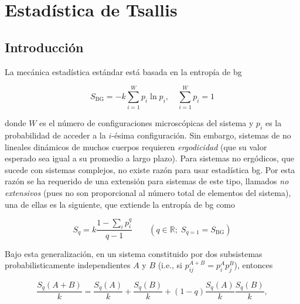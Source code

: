 \chapter{Estadística de Tsallis}\label{ch-Tsallis}


\section{Introducción}

La mecánica estadística estándar está basada en la entropía de \acrfull{bg}

\begin{equation}
{S}_{\mathrm{BG}} = - k \sum_{i=1}^{W} {p}_{i} \ln {p}_{i}, \quad \sum_{i=1}^{W} {p}_{i} = 1
\end{equation}

donde $W$ es el número de configuraciones microscópicas del sistema y ${p}_{i}$ es la probabilidad de acceder a la $i$-ésima configuración. Sin embargo, sistemas de no lineales dinámicos de muchos cuerpos requieren \emph{ergodicidad} (que su valor esperado sea igual a su promedio a largo plazo). Para sistemas no ergódicos, que sucede con sistemas complejos, no existe razón para usar estadística \acrshort{bg}. Por esta razón se ha requerido de una extensión para sistemas de este tipo, llamados \emph{no extensivos} (pues no son proporcional al número total de elementos del sistema), una de ellas es la siguiente, que extiende la entropía de \acrshort{bg} como

\begin{equation}
{S}_{q} = k \frac{1-\sum_{i} {p}_{i}^{q}}{q-1} \qquad (q\in \mathbb{R};\; {S}_{q=1} = {S}_{\mathrm{BG}})
\end{equation}

Bajo esta generalización, en un sistema constituido por dos subsistemas probabilisticamente independientes $A$ y $B$ (i.e., si ${p}_{ij}^{A+B} = {p}_{i}^{A}{p}_{j}^{B}$), entonces

\begin{equation}\label{eq-TsallisTwoSystems}
\frac{{S}_{q}(A+B)}{k} = \frac{{S}_{q}(A)}{k} + \frac{{S}_{q}(B)}{k} + (1 - q) \frac{{S}_{q}(A)}{k}\frac{{S}_{q}(B)}{k},
\end{equation}

